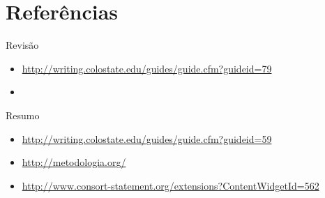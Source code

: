\documentclass{beamer}
\begin{document}
\section{Referências}

\begin{frame}
  Revisão
  \begin{itemize}
  \item<1-> \url{http://writing.colostate.edu/guides/guide.cfm?guideid=79}
  \item<1-> \url{}
  \end{itemize}

  Resumo
  \begin{itemize}
  \item<1-> \url{http://writing.colostate.edu/guides/guide.cfm?guideid=59}
  \item<1-> \url{http://metodologia.org/}
  \item<1-> \url{http://www.consort-statement.org/extensions?ContentWidgetId=562}
  \end{itemize}
\end{frame}
\end{document}

